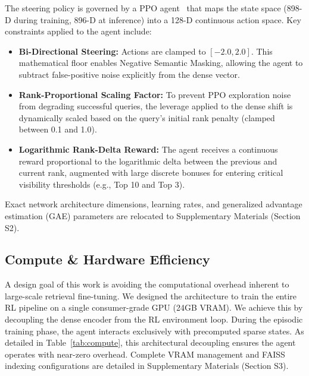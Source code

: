 \documentclass[sigconf]{acmart}
\begin{document}
The steering policy is governed by a PPO agent~\cite{schulman2017} that maps the state space (898-D during training, 896-D at inference) into a 128-D continuous action space. Key constraints applied to the agent include:

\begin{itemize}
\item \textbf{Bi-Directional Steering:} Actions are clamped to $[-2.0, 2.0]$. This mathematical floor enables Negative Semantic Masking, allowing the agent to subtract false-positive noise explicitly from the dense vector.
\item \textbf{Rank-Proportional Scaling Factor:} To prevent PPO exploration noise from degrading successful queries, the leverage applied to the dense shift is dynamically scaled based on the query's initial rank penalty (clamped between 0.1 and 1.0).
\item \textbf{Logarithmic Rank-Delta Reward:} The agent receives a continuous reward proportional to the logarithmic delta between the previous and current rank, augmented with large discrete bonuses for entering critical visibility thresholds (e.g., Top 10 and Top 3).
\end{itemize}

Exact network architecture dimensions, learning rates, and generalized advantage estimation (GAE) parameters are relocated to Supplementary Materials (Section S2).

\subsection{Compute \& Hardware Efficiency}

A design goal of this work is avoiding the computational overhead inherent to large-scale retrieval fine-tuning. We designed the architecture to train the entire RL pipeline on a single consumer-grade GPU (24GB VRAM). We achieve this by decoupling the dense encoder from the RL environment loop. During the episodic training phase, the agent interacts exclusively with precomputed sparse states. As detailed in Table~\ref{tab:compute}, this architectural decoupling ensures the agent operates with near-zero overhead. Complete VRAM management and FAISS indexing configurations are detailed in Supplementary Materials (Section S3).
\end{document}
